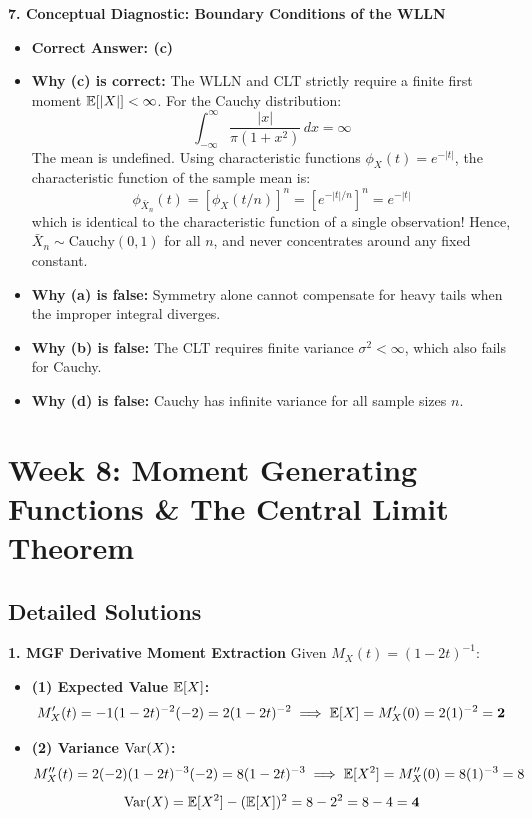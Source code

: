 \textbf{7. Conceptual Diagnostic: Boundary Conditions of the WLLN}
\begin{itemize}
    \item \textbf{Correct Answer: (c)}
    \item \textbf{Why (c) is correct:} The WLLN and CLT strictly require a finite first moment $\mathbb{E}[|X|] < \infty$. For the Cauchy distribution:
    $$\int_{-\infty}^\infty \frac{|x|}{\pi(1+x^2)} \, dx = \infty$$
    The mean is undefined. Using characteristic functions $\phi_X(t) = e^{-|t|}$, the characteristic function of the sample mean is:
    $$\phi_{\bar{X}_n}(t) = \left[ \phi_X(t/n) \right]^n = \left[ e^{-|t|/n} \right]^n = e^{-|t|}$$
    which is identical to the characteristic function of a single observation! Hence, $\bar{X}_n \sim \text{Cauchy}(0, 1)$ for all $n$, and never concentrates around any fixed constant.
    \item \textbf{Why (a) is false:} Symmetry alone cannot compensate for heavy tails when the improper integral diverges.
    \item \textbf{Why (b) is false:} The CLT requires finite variance $\sigma^2 < \infty$, which also fails for Cauchy.
    \item \textbf{Why (d) is false:} Cauchy has infinite variance for all sample sizes $n$.
\end{itemize}

\section*{Week 8: Moment Generating Functions \& The Central Limit Theorem}

\subsection*{Detailed Solutions}

\textbf{1. MGF Derivative Moment Extraction}
Given $M_X(t) = (1 - 2t)^{-1}$:
\begin{itemize}
    \item \textbf{(1) Expected Value $\mathbb{E}[X]$:}
    $$M_X'(t) = -1(1 - 2t)^{-2}(-2) = 2(1 - 2t)^{-2} \implies \mathbb{E}[X] = M_X'(0) = 2(1)^{-2} = \mathbf{2}$$
    \item \textbf{(2) Variance $\operatorname{Var}(X)$:}
    $$M_X''(t) = 2(-2)(1 - 2t)^{-3}(-2) = 8(1 - 2t)^{-3} \implies \mathbb{E}[X^2] = M_X''(0) = 8(1)^{-3} = 8$$
    $$\operatorname{Var}(X) = \mathbb{E}[X^2] - (\mathbb{E}[X])^2 = 8 - 2^2 = 8 - 4 = \mathbf{4}$$
\end{itemize}

